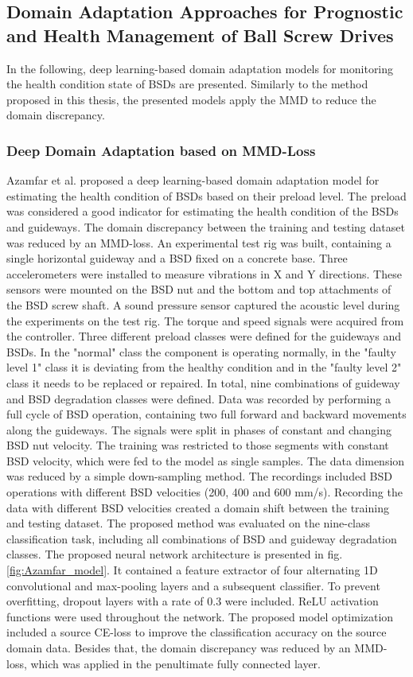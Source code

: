 \subsection{Domain Adaptation Approaches for Prognostic and Health Management of Ball Screw Drives}
In the following, deep learning-based domain adaptation models for monitoring the health condition state of BSDs are presented. Similarly to the method proposed in this thesis, the presented models apply the MMD to reduce the domain discrepancy.


\subsubsection{Deep Domain Adaptation based on MMD-Loss}
Azamfar et al. \cite{AZAMFAR2020103932} proposed a deep learning-based domain adaptation model for estimating the health condition of BSDs based on their preload level. The preload was considered a good indicator for estimating the health condition of the BSDs and guideways. The domain discrepancy between the training and testing dataset was reduced by an MMD-loss. An experimental test rig was built, containing a single horizontal guideway and a BSD fixed on a concrete base. Three accelerometers were installed to measure vibrations in X and Y directions. These sensors were mounted on the BSD nut and the bottom and top attachments of the BSD screw shaft. A sound pressure sensor captured the acoustic level during the experiments on the test rig. The torque and speed signals were acquired from the controller. Three different preload classes were defined for the guideways and BSDs. In the "normal" class the component is operating normally, in the "faulty level 1" class it is deviating from the healthy condition and in the "faulty level 2" class it needs to be replaced or repaired. In total, nine combinations of guideway and BSD degradation classes were defined. Data was recorded by performing a full cycle of BSD operation, containing two full forward and backward movements along the guideways. The signals were split in phases of constant and changing BSD nut velocity. The training was restricted to those segments with constant BSD velocity, which were fed to the model as single samples. The data dimension was reduced by a simple down-sampling method. The recordings included BSD operations with different BSD velocities (200, 400 and 600 mm/s). Recording the data with different BSD velocities created a domain shift between the training and testing dataset. The proposed method was evaluated on the nine-class classification task, including all combinations of BSD and guideway degradation classes. The proposed neural network architecture is presented in fig. \ref{fig:Azamfar_model}. It contained a feature extractor of four alternating 1D convolutional and max-pooling layers and a subsequent classifier. To prevent overfitting, dropout layers with a rate of 0.3 were included. ReLU activation functions were used throughout the network. The proposed model optimization included a source CE-loss to improve the classification accuracy on the source domain data. Besides that, the domain discrepancy was reduced by an MMD-loss, which was applied in the penultimate fully connected layer. 

